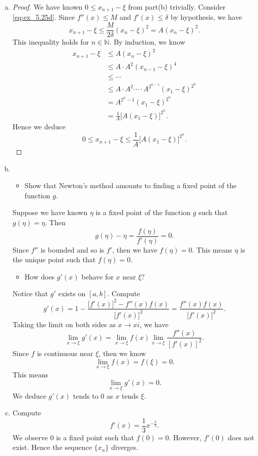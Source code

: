 \begin{Exercise}
\begin{enumerate}[(a)]
\item
\begin{proof}
We have known $0 \leq x_{n+1} - \xi$ from part(b) trivially.
Consider \eqref{eq:ex_5.25d}.
Since $f''(x) \leq M$ and $f'(x) \leq \delta$ by hypothesis, we have
$$
x_{n+1}-\xi \leq \frac{M}{2\delta}(x_n-\xi)^2 = A(x_n-\xi)^2.
$$
This inequality holds for $n\in\mathbb{N}$. By induction, we know
\begin{align*}
x_{n+1}-\xi
&\leq A(x_n-\xi)^2 \\
&\leq A\cdot A^2 (x_{n-1}-\xi)^4 \\
&\leq \cdots \\
&\leq A\cdot A^2 \cdots \cdot A^{2^{n-1}} (x_1-\xi)^{2^n} \\
&= A^{2^n-1} (x_1-\xi)^{2^n} \\
&= \frac{1}{A} \big[A(x_1-\xi)\big]^{2^n}.
\end{align*}
Hence we deduce
$$
0 \leq x_{n+1}-\xi \leq \frac{1}{A} \big[A(x_1-\xi)\big]^{2^n}.
$$
\end{proof}

\item
\begin{itemize}
\item Show that Newton's method amounts to finding a fixed point of the function $g$. 
\end{itemize}
\begin{solution}
Suppose we have known $\eta$ is a fixed point of the function $g$ such that $g(\eta) = \eta$. Then
$$
g(\eta) - \eta = \frac{f(\eta)}{f'(\eta)} = 0.
$$
Since $f''$ is bounded and so is $f'$, then we have $f(\eta) = 0$.
This means $\eta$ is the unique point such that $f(\eta) = 0$.
\end{solution}
\begin{itemize}
\item How does $g'(x)$ behave for $x$ near $\xi$?
\end{itemize}
\begin{solution}
Notice that $g'$ exists on $[a,b]$. Compute
$$
g'(x) = 1 - \frac{\big[ f'(x) \big]^2 - f''(x) f(x)}{\big[ f'(x) \big]^2} = \frac{f''(x) f(x)}{\big[ f'(x) \big]^2}.
$$
Taking the limit on both sides as $x\to xi$, we have
$$
\lim_{x\to\xi}g'(x) = \lim_{x\to\xi}f(x) \lim_{x\to\xi} \frac{f''(x)}{[f'(x)]^2}.
$$
Since $f$ is continuous near $\xi$, then we know
$$
\lim_{x\to\xi} f(x) = f(\xi) = 0.
$$
This means
$$
\lim_{x\to\xi}g'(x) = 0.
$$
We deduce $g'(x)$ tends to $0$ as $x$ tends $\xi$.
\end{solution}

\item
\begin{solution}
Compute
$$
f'(x) = \frac{1}{3} x^{-\frac{2}{3}}.
$$
We observe $0$ is a fixed point such that $f(0) = 0$.
However, $f'(0)$ does not exist.
Hence the sequence $\{x_n\}$ diverges.
\end{solution}
\end{enumerate}
\end{Exercise}